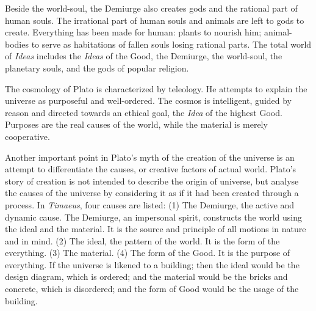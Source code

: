 \documentclass[11pt]{article}
\begin{document}
\begin{sloppypar}
\newline

Beside the world-soul, the Demiurge also creates gods and the rational part of human souls. 
The irrational part of human souls and animals are left to gods to create. 
Everything has been made for human: 
plants to nourish him; 
animal-bodies to serve as habitations of fallen souls losing rational parts. 
The total world of \textit{Ideas} includes the \textit{Ideas} of the Good, the Demiurge, the world-soul, the planetary souls, and the gods of popular religion.

\newline

The cosmology of Plato is characterized by teleology. 
He attempts to explain the universe as purposeful and well-ordered. 
The cosmos is intelligent, guided by reason and directed towards an ethical goal, the \textit{Idea} of the highest Good. 
Purposes are the real causes of the world, while the material is merely cooperative.

\newline

Another important point in Plato’s myth of the creation of the universe is an attempt to differentiate the causes, or creative factors of actual world. 
Plato’s story of creation is not intended to describe the origin of universe, but analyse the causes of the universe by considering it as if it had been created through a process. 
In \textit{Timaeus}, four causes are listed: 
(1) The Demiurge, the active and dynamic cause. The Demiurge, an impersonal spirit, constructs the world using the ideal and the material. 
It is the source and principle of all motions in nature and in mind. 
(2) The ideal, the pattern of the world. 
It is the form of the everything. 
(3) The material. 
(4) The form of the Good. 
It is the purpose of everything. 
If the universe is likened to a building; 
then the ideal would be the design diagram, which is ordered; 
and the material would be the bricks and concrete, which is disordered; 
and the form of Good would be the usage of the building. 
  

\end{sloppypar}
\end{document}
